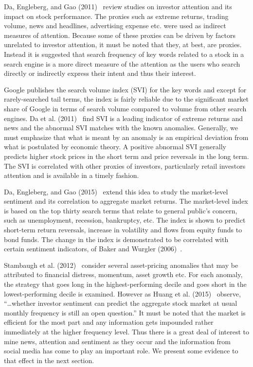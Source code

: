 Da, Engleberg, and Gao (2011)~\cite{da2011search} review studies on investor attention and its impact on stock performance. The proxies such as extreme returns, trading volume, news and headlines, advertising expense etc. were used as indirect measures of attention. Because some of these proxies can be driven by factors unrelated to investor attention, it must be noted that they, at best, are proxies. Instead it is suggested that search frequency of key words related to a stock in a search engine is a more direct measure of the attention as the users who search directly or indirectly express their intent and thus their interest.


Google publishes the search volume index (SVI) for the key words and except for rarely-searched tail terms, the index is fairly reliable due to the significant market share of Google in terms of search volume compared to volume from other search engines. Da et al. (2011)~\cite{da2011search} find SVI is a leading indicator of extreme returns and news and the abnormal SVI matches with the known anomalies. Generally, we must emphasize that what is meant by an anomaly is an empirical deviation from what is postulated by economic theory. A positive abnormal SVI generally predicts higher stock prices in the short term and price reversals in the long term. The SVI is correlated with other proxies of investors, particularly retail investors attention and is available in a timely fashion. 


Da, Engleberg, and Gao (2015)~\cite{da2015sum} extend this idea to study the market-level sentiment and its correlation to aggregate market returns. The market-level index is based on the top thirty search terms that relate to general public's concern, such as unemployment, recession, bankruptcy, etc. The index is shown to predict short-term return reversals, increase in volatility and flows from equity funds to bond funds. The change in the index is demonstrated to be correlated with certain sentiment indicators, of Baker and Wurgler (2006)~\cite{baker2006investor}.


Stambaugh et al. (2012)~\cite{stamb} consider several asset-pricing anomalies that may be attributed to financial distress, momentum, asset growth etc. For each anomaly, the strategy that goes long in the highest-performing decile and goes short in the lowest-performing decile is examined. However as Huang et al. (2015)~\cite{huang} observe, ``\dots whether investor sentiment can predict the aggregate stock market at usual monthly frequency is still an open question.'' It must be noted that the market is efficient for the most part and any information gets impounded rather immediately at the higher frequency level. Thus there is a great deal of interest to mine news, attention and sentiment as they occur and the information from social media has come to play an important role. We present some evidence to that effect in the next section. 



